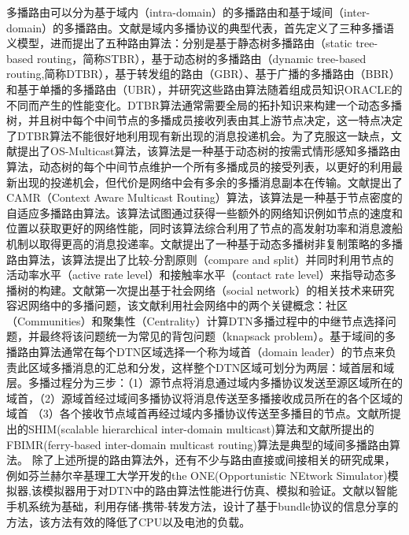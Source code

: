 多播路由可以分为基于域内（intra-domain）的多播路由和基于域间（inter-domain）的多播路由。文献是域内多播协议的典型代表，首先定义了三种多播语义模型，进而提出了五种路由算法：分别是基于静态树多播路由（static tree-based routing，简称STBR），基于动态树的多播路由（dynamic tree-based routing,简称DTBR），基于转发组的路由（GBR）、基于广播的多播路由（BBR）和基于单播的多播路由（UBR），并研究这些路由算法随着组成员知识ORACLE的不同而产生的性能变化。DTBR算法通常需要全局的拓扑知识来构建一个动态多播树，并且树中每个中间节点的多播成员接收列表由其上游节点决定，这一特点决定了DTBR算法不能很好地利用现有新出现的消息投递机会。为了克服这一缺点，文献提出了OS-Multicast算法，该算法是一种基于动态树的按需式情形感知多播路由算法，动态树的每个中间节点维护一个所有多播成员的接受列表，以更好的利用最新出现的投递机会，但代价是网络中会有多余的多播消息副本在传输。文献提出了CAMR（Context Aware Multicast Routing）算法，该算法是一种基于节点密度的自适应多播路由算法。该算法试图通过获得一些额外的网络知识例如节点的速度和位置以获取更好的网络性能，同时该算法综合利用了节点的高发射功率和消息渡船机制以取得更高的消息投递率。文献提出了一种基于动态多播树非复制策略的多播路由算法，该算法提出了比较-分割原则（compare and split）并同时利用节点的活动率水平（active rate level）和接触率水平（contact rate level）来指导动态多播树的构建。文献第一次提出基于社会网络（social network）的相关技术来研究容迟网络中的多播问题，该文献利用社会网络中的两个关键概念：社区（Communities）和聚集性（Centrality）计算DTN多播过程中的中继节点选择问题，并最终将该问题统一为常见的背包问题（knapsack problem）。基于域间的多播路由算法通常在每个DTN区域选择一个称为域首（domain leader）的节点来负责此区域多播消息的汇总和分发，这样整个DTN区域可划分为两层：域首层和域层。多播过程分为三步：（1）源节点将消息通过域内多播协议发送至源区域所在的域首，（2）源域首经过域间多播协议将消息传送至多播接收成员所在的各个区域的域首 （3）各个接收节点域首再经过域内多播协议传送至多播目的节点。文献所提出的SHIM(scalable hierarchical inter-domain multicast)算法和文献所提出的FBIMR(ferry-based inter-domain multicast routing)算法是典型的域间多播路由算法。
除了上述所提的路由算法外，还有不少与路由直接或间接相关的研究成果，例如芬兰赫尔辛基理工大学开发的the ONE(Opportunistic NEtwork Simulator)模拟器,该模拟器用于对DTN中的路由算法性能进行仿真、模拟和验证。文献以智能手机系统为基础，利用存储-携带-转发方法，设计了基于bundle协议的信息分享的方法，该方法有效的降低了CPU以及电池的负载。

